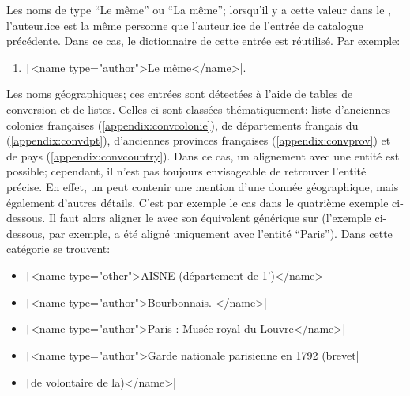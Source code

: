 Les noms de type \enquote{Le même} ou \enquote{La même}; lorsqu'il y a cette valeur dans le \tname{}, l'auteur.ice est la même personne que l'auteur.ice de l'entrée de catalogue précédente. Dans ce cas, le dictionnaire de cette entrée est réutilisé. Par exemple:
\begin{enumerate}
	\item \texttt|<name type="author">Le même</name>|.
\end{enumerate}

Les noms géographiques; ces entrées sont détectées à l'aide de tables de conversion et de listes. Celles-ci sont classées thématiquement: liste d'anciennes colonies françaises (\ref{appendix:convcolonie}), de départements français du (\ref{appendix:convdpt}), d'anciennes provinces françaises (\ref{appendix:convprov}) et de pays (\ref{appendix:convcountry}). Dans ce cas, un alignement avec une entité \wkd{} est possible; cependant, il n'est pas toujours envisageable de retrouver l'entité précise. En effet, un \tname{} peut contenir une mention d'une donnée géographique, mais également d'autres détails. C'est par exemple le cas dans le quatrième exemple ci-dessous. Il faut alors aligner le \tname{} avec son équivalent générique sur \wkd{} (l'exemple ci-dessous, par exemple, a été aligné uniquement avec l'entité \enquote{Paris}). Dans cette catégorie se trouvent:
\begin{itemize}
	\item \texttt|<name type="other">AISNE (département de 1')</name>|
	\item \texttt|<name type="author">Bourbonnais. </name>|
	\item \texttt|<name type="author">Paris : Musée royal du Louvre</name>|
	\item \texttt|<name type="author">Garde nationale parisienne en 1792 (brevet|
\end{itemize}
\begin{itemize}[label={}]
	\item \texttt|de volontaire de la)</name>|
\end{itemize}

